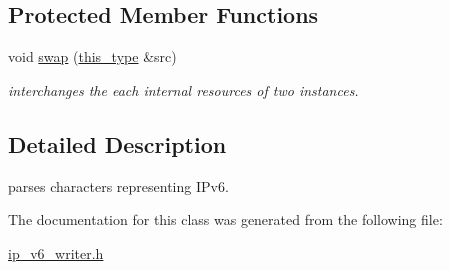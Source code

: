 \subsection*{Protected Member Functions}
\begin{DoxyCompactItemize}
\item 
\hypertarget{classhryky_1_1ip_1_1v6_1_1_writer_ac5b4ce9dd6a96419bf630b791e1113d1}{void \hyperlink{classhryky_1_1ip_1_1v6_1_1_writer_ac5b4ce9dd6a96419bf630b791e1113d1}{swap} (\hyperlink{classhryky_1_1ip_1_1v6_1_1_writer_ab87fa5857b896ccb6e80da83edd48c32}{this\-\_\-type} \&src)}\label{classhryky_1_1ip_1_1v6_1_1_writer_ac5b4ce9dd6a96419bf630b791e1113d1}

\begin{DoxyCompactList}\small\item\em interchanges the each internal resources of two instances. \end{DoxyCompactList}\end{DoxyCompactItemize}


\subsection{Detailed Description}
parses characters representing I\-Pv6. 

The documentation for this class was generated from the following file\-:\begin{DoxyCompactItemize}
\item 
\hyperlink{ip__v6__writer_8h}{ip\-\_\-v6\-\_\-writer.\-h}\end{DoxyCompactItemize}
